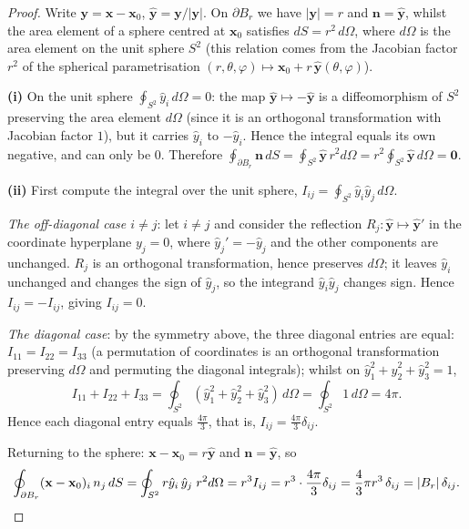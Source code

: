 \begin{proof}
Write $\mathbf y = \mathbf x-\mathbf x_0$, $\hat{\mathbf y} = \mathbf y/|\mathbf y|$. On $\partial B_r$ we have $|\mathbf y| = r$ and $\mathbf n = \hat{\mathbf y}$, whilst the area element of a sphere centred at $\mathbf x_0$ satisfies $dS = r^2\,d\Omega$, where $d\Omega$ is the area element on the unit sphere $S^2$ (this relation comes from the Jacobian factor $r^2$ of the spherical parametrisation $(r,\theta,\varphi)\mapsto \mathbf x_0+r\,\hat{\mathbf y}(\theta,\varphi)$).

\textbf{(i)} On the unit sphere $\oint_{S^2} \hat y_i \, d\Omega = 0$: the map $\hat{\mathbf y}\mapsto -\hat{\mathbf y}$ is a diffeomorphism of $S^2$ preserving the area element $d\Omega$ (since it is an orthogonal transformation with Jacobian factor $1$), but it carries $\hat y_i$ to $-\hat y_i$. Hence the integral equals its own negative, and can only be $0$. Therefore
$\oint_{\partial B_r}\mathbf n\,dS = \oint_{S^2} \hat{\mathbf y}\,r^2d\Omega = r^2\oint_{S^2}\hat{\mathbf y}\,d\Omega=\mathbf 0$.

\textbf{(ii)} First compute the integral over the unit sphere, $I_{ij} = \oint_{S^2}\hat y_i\hat y_j\,d\Omega$.

\emph{The off-diagonal case $i\ne j$}: let $i\ne j$ and consider the reflection $R_j: \hat{\mathbf y}\mapsto \hat{\mathbf y}'$ in the coordinate hyperplane $y_j = 0$, where $\hat y_j' = -\hat y_j$ and the other components are unchanged. $R_j$ is an orthogonal transformation, hence preserves $d\Omega$; it leaves $\hat y_i$ unchanged and changes the sign of $\hat y_j$, so the integrand $\hat y_i\hat y_j$ changes sign. Hence $I_{ij} = -I_{ij}$, giving $I_{ij}=0$.

\emph{The diagonal case}: by the symmetry above, the three diagonal entries are equal: $I_{11}=I_{22}=I_{33}$ (a permutation of coordinates is an orthogonal transformation preserving $d\Omega$ and permuting the diagonal integrals); whilst on $\hat y_1^2+\hat y_2^2+\hat y_3^2 = 1$,
\[
I_{11}+I_{22}+I_{33} = \oint_{S^2} (\hat y_1^2+\hat y_2^2+\hat y_3^2)\,d\Omega = \oint_{S^2} 1\,d\Omega = 4\pi .
\]
Hence each diagonal entry equals $\tfrac{4\pi}{3}$, that is, $I_{ij} = \tfrac{4\pi}{3}\delta_{ij}$.

Returning to the sphere: $\mathbf x-\mathbf x_0 = r\hat{\mathbf y}$ and $\mathbf n = \hat{\mathbf y}$, so
\[
\oint_{\partial B_r}(\mathbf x-\mathbf x_0)_i\,n_j\,dS
= \oint_{S^2} r\hat y_i\,\hat y_j\; r^2 d\Omega
= r^3 I_{ij}
= r^3\cdot\frac{4\pi}{3}\delta_{ij}
= \frac{4}{3}\pi r^3\,\delta_{ij}
= |B_r|\,\delta_{ij}. \qedhere
\]
\end{proof}


